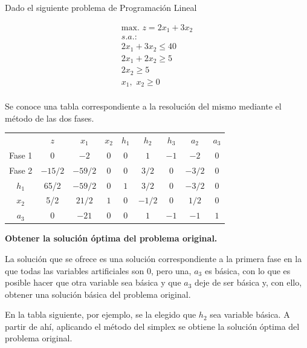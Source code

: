 Dado el siguiente problema de Programación Lineal

\begin{equation}
\begin{split}
\mbox{max. } z = 2x_1 + 3x_2\\
s.a.:\\
2x_1 + 3x_2 \leq 40\\
2x_1 + 2x_2 \geq 5\\
2x_2 \geq 5\\
x_1,\,\,x_2\geq 0\\
\end{split}
\end{equation}

Se conoce una tabla correspondiente a la resolución del mismo mediante el método de las dos fases.

\begin{center}
\begin{tabular}{c|c|ccccccc|}
 & $z$ & $x_1$ & $x_2$ & $h_1$ & $h_2$ & $h_3$ & $a_2$ & $a_3$\\ 
Fase 1 & $0$ & $-2$ & $0$ & $0$ & $1$ & $-1$ & $-2$ & $0$ \\ 
Fase 2 & $-15/2$ & $-59/2$ & $0$ & $0$ & $3/2$ & $0$ & $-3/2$ & $0$ \\ 
\hline
$h_1$ & 65/2  & $-59/2$ & $0$ & $1$ & $3/2$ & $0$ & $-3/2$ & $0$\\ 
$x_2$ & 5/2  & $21/2$ & $1$ & $0$ & $-1/2$ & $0$ & $1/2$ & $0$\\ 
$a_3$ & 0  & $-21$ & $0$ & $0$ & $1$ & $-1$ & $-1$ & $1$\\ 
\hline
\end{tabular}
\end{center}

\noindent \textbf{Obtener la solución óptima del problema original.}
\vspace{0.5cm}

La solución que se ofrece es una solución correspondiente a la primera fase en la que todas las variables artificiales son 0, pero una, $a_3$ es básica, con lo que es posible hacer que otra variable sea básica y que $a_3$ deje de ser básica y, con ello, obtener una solución básica del problema original. 

En la tabla siguiente, por ejemplo, se la elegido que $h_2$ sea variable básica. A partir de ahí, aplicando el método del simplex se obtiene la solución óptima del problema original.

